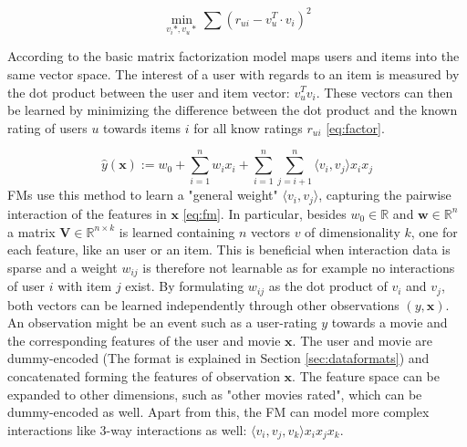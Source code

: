 \begin{equation}
\min_{v_i*, v_u*} \sum(r_{ui} - v_u^T \cdot v_i)^2
 \label{eq:factor}
\end{equation}

According to \textcite{bokde2015matrix} the basic matrix factorization model maps users and items into the same vector space. The interest of a user with regards to an item is measured by the dot product between the user and item vector: $v_u^Tv_i$. These vectors can then be learned by minimizing the difference between the dot product and the known rating of users $u$ towards items $i$ for all know ratings $r_{ui}$ \eqref{eq:factor}. 

\begin{equation}
\hat{y}(\mathbf{x}) := w_0 + \sum_{i=1}^{n} w_i x_i + \sum_{i=1}^{n} \sum_{j=i+1}^{n} \langle v_i, v_j \rangle x_i x_j  \label{eq:fm}
\end{equation}
FMs \parencite{rendle2010factorization} use this method to learn a "general weight"  $\langle v_i, v_j \rangle$, capturing the pairwise interaction of the features in $\mathbf{x}$ \eqref{eq:fm}. 
In particular, besides $w_0 \in \mathbb{R}$ and $\mathbf{w} \in \mathbb{R}^n$ a matrix $\mathbf{V} \in \mathbb{R}^{n \times k}$ is learned containing $n$ vectors $v$ of dimensionality $k$, one for each feature, like an user or an item. This is beneficial when interaction data is sparse and a weight $w_{ij}$ is therefore not learnable as for example no interactions of user $i$ with item $j$ exist. By formulating $w_{ij}$ as the dot product of $v_i$ and $v_j$, both vectors can be learned independently through other observations $(y,\mathbf{x})$. An observation might be an event such as a user-rating $y$ towards a movie and the corresponding features of the user and movie $\mathbf{x}$.  The user and movie are dummy-encoded (The format is explained in Section \ref{sec:dataformats})  and concatenated forming the features of observation $\mathbf{x}$. The feature space can be expanded to other dimensions, such as "other movies rated", which can be dummy-encoded as well. Apart from this, the FM can model more complex interactions like 3-way interactions as well: $\langle v_i, v_j, v_k \rangle x_i x_j x_k$.




